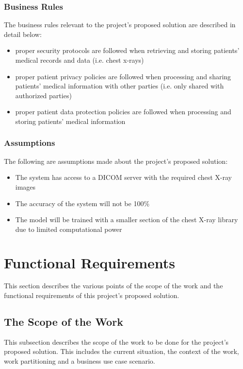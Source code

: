 \documentclass[12pt]{article}
\begin{document}
\subsubsection{Business Rules}
The business rules relevant to the project's proposed solution are described in detail below:
\begin{itemize}
    \item proper security protocols are followed when retrieving and storing patients' medical records and data (i.e. chest x-rays)
    \item proper patient privacy policies are followed when processing and sharing patients' medical information with other parties (i.e. only shared with authorized parties)
    \item proper patient data protection policies are followed when processing and storing patients' medical information
\end{itemize}

\subsubsection{Assumptions}
The following are assumptions made about the project's proposed solution:
\begin{itemize}
    \item The system has access to a DICOM server with the required chest X-ray images 
    \item The accuracy of the system will not be 100\%
    \item The model will be trained with a smaller section of the chest X-ray library due to limited computational power
\end{itemize} 

\section{Functional Requirements}
This section describes the various points of the scope of the work and the functional requirements of this project's proposed solution.

\subsection{The Scope of the Work}
This subsection describes the scope of the work to be done for the project's proposed solution. This includes the current situation, the context of the work, work partitioning and a business use case scenario.
\end{document}
